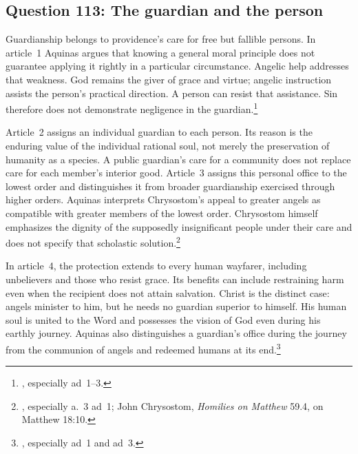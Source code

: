 
\subsection{Question 113: The guardian and the person}\label{q113}
Guardianship belongs to providence's care for free but fallible persons. In article~1 Aquinas argues that knowing a general moral principle does not guarantee applying it rightly in a particular circumstance. Angelic help addresses that weakness. God remains the giver of grace and virtue; angelic instruction assists the person's practical direction. A person can resist that assistance. Sin therefore does not demonstrate negligence in the guardian.\footnote{, especially ad~1--3.}

Article~2 assigns an individual guardian to each person. Its reason is the enduring value of the individual rational soul, not merely the preservation of humanity as a species. A public guardian's care for a community does not replace care for each member's interior good. Article~3 assigns this personal office to the lowest order and distinguishes it from broader guardianship exercised through higher orders. Aquinas interprets Chrysostom's appeal to greater angels as compatible with greater members of the lowest order. Chrysostom himself emphasizes the dignity of the supposedly insignificant people under their care and does not specify that scholastic solution.\footnote{, especially a.~3 ad~1; John Chrysostom, \emph{Homilies on Matthew} 59.4, on Matthew 18:10.}

In article~4, the protection extends to every human wayfarer, including unbelievers and those who resist grace. Its benefits can include restraining harm even when the recipient does not attain salvation. Christ is the distinct case: angels minister to him, but he needs no guardian superior to himself. His human soul is united to the Word and possesses the vision of God even during his earthly journey. Aquinas also distinguishes a guardian's office during the journey from the communion of angels and redeemed humans at its end.\footnote{, especially ad~1 and ad~3.}

